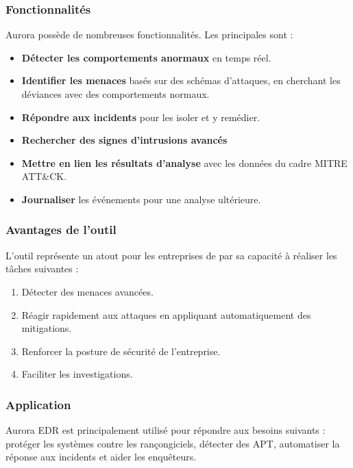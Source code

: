 \documentclass[12pt,letterpaper]{article}
\begin{document}
\subsubsection{Fonctionnalités}

Aurora possède de nombreuses fonctionnalités. Les principales sont :
\begin{itemize}
    \item \textbf{Détecter les comportements anormaux} en temps réel.
    \item \textbf{Identifier les menaces} basés sur des schémas d'attaques, en cherchant les déviances avec des comportements normaux.
    \item \textbf{Répondre aux incidents} pour les isoler et y remédier.
    \item \textbf{Rechercher des signes d'intrusions avancés}
    \item \textbf{Mettre en lien les résultats d'analyse} avec les données du cadre MITRE ATT\&CK.
    \item \textbf{Journaliser} les événements pour une analyse ultérieure.
\end{itemize}

\subsubsection{Avantages de l'outil}

L'outil représente un atout pour les entreprises de par sa capacité à réaliser les tâches suivantes :
\begin{enumerate}
    \item Détecter des menaces avancées.
    \item Réagir rapidement aux attaques en appliquant automatiquement des mitigations.
    \item Renforcer la posture de sécurité de l'entreprise.
    \item Faciliter les investigations.
\end{enumerate}

\subsubsection{Application}

Aurora EDR est principalement utilisé pour répondre aux besoins suivants : protéger les systèmes contre les rançongiciels, détecter des APT, automatiser la réponse aux incidents et aider les enquêteurs.

\bigskip
\end{document}
